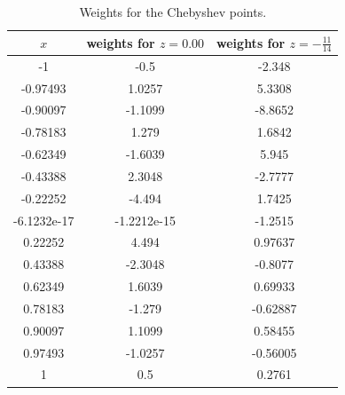 \documentclass[12pt]{article}
\begin{document}
\begin{table}[H]
	\caption{Weights for the Chebyshev points.}
\begin{center}
	\begin{tabular}{|c|c|c|}
		\hline
		$x$&weights for $z=0.00$&weights for $z=-\tfrac{11}{14}$\\ \hline
		-1&-0.5&-2.348\\ \hline
		-0.97493&1.0257&5.3308\\ \hline
		-0.90097&-1.1099&-8.8652\\ \hline
		-0.78183&1.279&1.6842\\ \hline
		-0.62349&-1.6039&5.945\\ \hline
		-0.43388&2.3048&-2.7777\\ \hline
		-0.22252&-4.494&1.7425\\ \hline
		-6.1232e-17&-1.2212e-15&-1.2515\\ \hline
		0.22252&4.494&0.97637\\ \hline
		0.43388&-2.3048&-0.8077\\ \hline
		0.62349&1.6039&0.69933\\ \hline
		0.78183&-1.279&-0.62887\\ \hline
		0.90097&1.1099&0.58455\\ \hline
		0.97493&-1.0257&-0.56005\\ \hline
		1&0.5&0.2761\\ \hline
	\end{tabular}
\end{center} \end{table}

\end{document}
